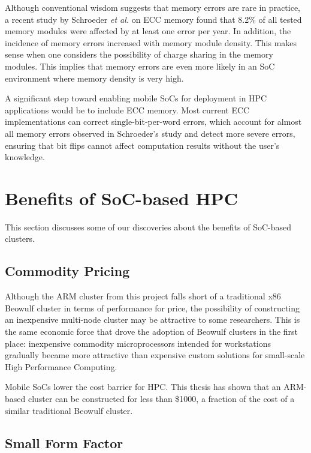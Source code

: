 \documentclass[11pt]{book}
\begin{document}
Although conventional wisdom suggests that memory errors are rare in practice, a recent
study by Schroeder \emph{et al.} \cite{schroeder-09} on ECC memory found that 8.2\% of all
tested memory modules were affected by at least one error per year.  In addition, the
incidence of memory errors increased with memory module density.  This makes sense when
one considers the possibility of charge sharing in the memory modules.  This implies that
memory errors are even more likely in an SoC environment where memory density is very
high.

A significant step toward enabling mobile SoCs for deployment in HPC applications would be
to include ECC memory.  Most current ECC implementations can correct single-bit-per-word
errors, which account for almost all memory errors observed in Schroeder's study
\cite{schroeder-09} and detect more severe errors, ensuring that bit flips cannot affect
computation results without the user's knowledge.

\section{Benefits of SoC-based HPC}

This section discusses some of our discoveries about the benefits of SoC-based clusters.

\subsection{Commodity Pricing}

Although the ARM cluster from this project falls short of a traditional x86 Beowulf
cluster in terms of performance for price, the possibility of constructing an inexpensive
multi-node cluster may be attractive to some researchers.  This is the same economic force
that drove the adoption of Beowulf clusters in the first place: inexpensive commodity
microprocessors intended for workstations gradually became more attractive than expensive
custom solutions for small-scale High Performance Computing.

Mobile SoCs lower the cost barrier for HPC.  This thesis has shown that an ARM-based
cluster can be constructed for less than \$1000, a fraction of the cost of a similar
traditional Beowulf cluster.

\subsection{Small Form Factor}
\end{document}
